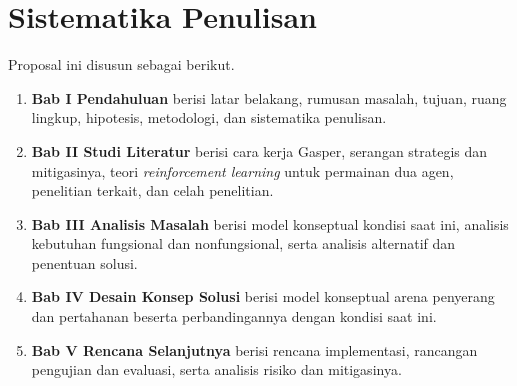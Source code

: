 \section{Sistematika Penulisan}
\label{sec:sistematika}
Proposal ini disusun sebagai berikut.
\begin{enumerate}
    \item \textbf{Bab I Pendahuluan} berisi latar belakang, rumusan masalah, tujuan, ruang lingkup, hipotesis, metodologi, dan sistematika penulisan.
    \item \textbf{Bab II Studi Literatur} berisi cara kerja Gasper, serangan strategis dan mitigasinya, teori \textit{reinforcement learning} untuk permainan dua agen, penelitian terkait, dan celah penelitian.
    \item \textbf{Bab III Analisis Masalah} berisi model konseptual kondisi saat ini, analisis kebutuhan fungsional dan nonfungsional, serta analisis alternatif dan penentuan solusi.
    \item \textbf{Bab IV Desain Konsep Solusi} berisi model konseptual arena penyerang dan pertahanan beserta perbandingannya dengan kondisi saat ini.
    \item \textbf{Bab V Rencana Selanjutnya} berisi rencana implementasi, rancangan pengujian dan evaluasi, serta analisis risiko dan mitigasinya.
\end{enumerate}